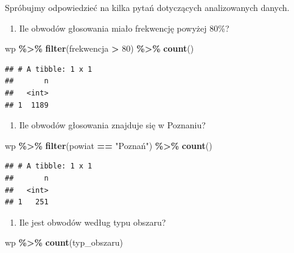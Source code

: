 \documentclass[
]{book}
\newenvironment{Shaded}{\begin{snugshade}}{\end{snugshade}}
\newcommand{\DecValTok}[1]{\textcolor[rgb]{0.00,0.00,0.81}{#1}}
\newcommand{\KeywordTok}[1]{\textcolor[rgb]{0.13,0.29,0.53}{\textbf{#1}}}
\newcommand{\NormalTok}[1]{#1}
\newcommand{\OperatorTok}[1]{\textcolor[rgb]{0.81,0.36,0.00}{\textbf{#1}}}
\newcommand{\StringTok}[1]{\textcolor[rgb]{0.31,0.60,0.02}{#1}}
\providecommand{\tightlist}{%
  \setlength{\itemsep}{0pt}\setlength{\parskip}{0pt}}
\begin{document}
Spróbujmy odpowiedzieć na kilka pytań dotyczących analizowanych danych.

\begin{enumerate}
\def\labelenumi{\arabic{enumi}.}
\tightlist
\item
  Ile obwodów głosowania miało frekwencję powyżej 80\%?
\end{enumerate}

\begin{Shaded}
\begin{Highlighting}[]
\NormalTok{wp }\OperatorTok{\%\textgreater{}\%}\StringTok{ }
\StringTok{  }\KeywordTok{filter}\NormalTok{(frekwencja }\OperatorTok{\textgreater{}}\StringTok{ }\DecValTok{80}\NormalTok{) }\OperatorTok{\%\textgreater{}\%}\StringTok{ }
\StringTok{  }\KeywordTok{count}\NormalTok{()}
\end{Highlighting}
\end{Shaded}

\begin{verbatim}
## # A tibble: 1 x 1
##       n
##   <int>
## 1  1189
\end{verbatim}

\begin{enumerate}
\def\labelenumi{\arabic{enumi}.}
\setcounter{enumi}{1}
\tightlist
\item
  Ile obwodów głosowania znajduje się w Poznaniu?
\end{enumerate}

\begin{Shaded}
\begin{Highlighting}[]
\NormalTok{wp }\OperatorTok{\%\textgreater{}\%}\StringTok{ }
\StringTok{  }\KeywordTok{filter}\NormalTok{(powiat }\OperatorTok{==}\StringTok{ "Poznań"}\NormalTok{) }\OperatorTok{\%\textgreater{}\%}\StringTok{ }
\StringTok{  }\KeywordTok{count}\NormalTok{()}
\end{Highlighting}
\end{Shaded}

\begin{verbatim}
## # A tibble: 1 x 1
##       n
##   <int>
## 1   251
\end{verbatim}

\begin{enumerate}
\def\labelenumi{\arabic{enumi}.}
\setcounter{enumi}{2}
\tightlist
\item
  Ile jest obwodów według typu obszaru?
\end{enumerate}

\begin{Shaded}
\begin{Highlighting}[]
\NormalTok{wp }\OperatorTok{\%\textgreater{}\%}\StringTok{ }
\StringTok{  }\KeywordTok{count}\NormalTok{(typ\_obszaru)}
\end{Highlighting}
\end{Shaded}
\end{document}
